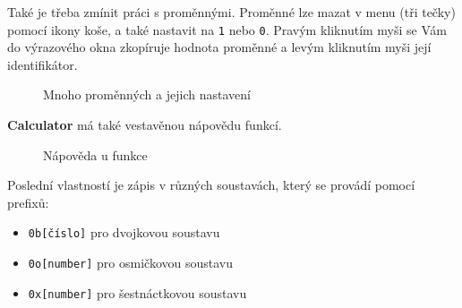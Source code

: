 \documentclass[a4paper, 11pt]{article}
\begin{document}
Také je třeba zmínit práci s proměnnými. Proměnné lze mazat v menu (tři
tečky) pomocí ikony koše, a také nastavit na \texttt{1} nebo \texttt{0}.
Pravým kliknutím myši se Vám do výrazového okna zkopíruje hodnota
proměnné a levým kliknutím myši její identifikátor.

\begin{figure}[H]
    \centering
    \caption{Mnoho proměnných a jejich nastavení}
\end{figure}

\noindent
\textbf{Calculator} má také vestavěnou nápovědu funkcí.

\begin{figure}[H]
    \centering
    \caption{Nápověda u funkce}
\end{figure}

\noindent
Poslední vlastností je zápis v různých soustavách, který se provádí pomocí
prefixů:
\begin{itemize}
    \item \texttt{0b{[}číslo{]}} pro dvojkovou soustavu 
    \item \texttt{0o{[}number{]}} pro osmičkovou soustavu 
    \item \texttt{0x{[}number{]}} pro šestnáctkovou soustavu
\end{itemize}
\end{document}
